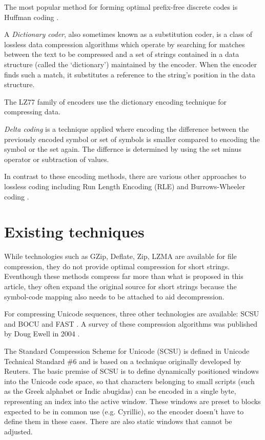 \documentclass[]{article}
\begin{document}
The most popular method for forming optimal prefix-free discrete codes is Huffman coding \cite{3}.

A \emph{Dictionary coder}, also sometimes known as a substitution coder, is a class of lossless data compression algorithms which operate by searching for matches between the text to be compressed and a set of strings contained in a data structure (called the \lq{dictionary}\rq) maintained by the encoder. When the encoder finds such a match, it substitutes a reference to the string's position in the data structure.

The LZ77 family of encoders use the dictionary encoding technique for compressing data. \cite{4}

\emph{Delta coding} is a technique applied where encoding the difference between the previously encoded symbol or set of symbols is smaller compared to encoding the symbol or the set again. The differnce is determined by using the set minus operator or subtraction of values. \cite{5}

In contrast to these encoding methods, there are various other approaches to lossless coding including Run Length Encoding (RLE) and Burrows-Wheeler coding \cite{6}.

\section{Existing techniques}

While technologies such as GZip, Deflate, Zip, LZMA are available for file compression, they do not provide optimal compression for short strings. Eventhough these methods compress far more than what is proposed in this article, they often expand the original source for short strings because the symbol-code mapping also needs to be attached to aid decompression.

For compressing Unicode sequences, three other technologies are available: SCSU \cite{10} and BOCU \cite{11} and FAST \cite{12}. A survey of these compression algorithms was published by Doug Ewell in 2004 \cite{13}.

The Standard Compression Scheme for Unicode (SCSU) is defined in Unicode Technical Standard \#6 and is based on a technique originally developed by Reuters. The basic premise of SCSU is to define dynamically positioned windows into the Unicode code space, so that characters belonging to small scripts (such as the Greek alphabet or Indic abugidas) can be
encoded in a single byte, representing an index into the active window. These windows are preset to blocks expected to be in common use (e.g. Cyrillic), so the encoder doesn’t have to define them in these cases. There are also static windows that cannot be adjusted. \cite{10} \cite{13}
\end{document}
